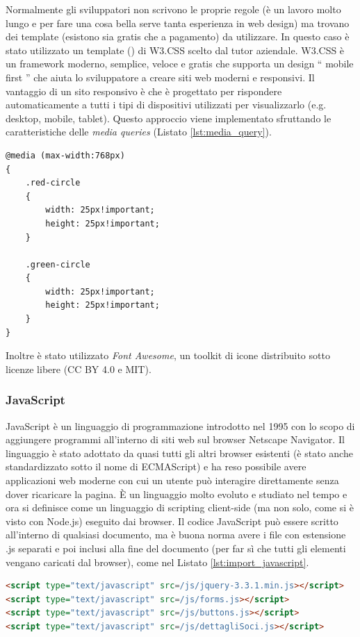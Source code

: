\documentclass[12pt]{report}
\begin{document}
Normalmente gli sviluppatori non scrivono le proprie regole (è un lavoro molto lungo e per fare una cosa bella serve tanta esperienza in web design) ma trovano dei template (esistono sia gratis che a pagamento) da utilizzare. In questo caso è stato utilizzato un template (\cite{w3css_template}) di W3.CSS scelto dal tutor aziendale. W3.CSS è un framework moderno, semplice, veloce e gratis che supporta un design \textquotedblleft{} mobile first \textquotedblright{} che aiuta lo sviluppatore a creare siti web moderni e responsivi. Il vantaggio di un sito responsivo è che è progettato per rispondere automaticamente a tutti i tipi di dispositivi utilizzati per visualizzarlo (e.g. desktop, mobile, tablet). Questo approccio viene implementato sfruttando le caratteristiche delle \emph{media queries} (Listato \ref{lst:media_query}).
\begin{lstlisting}[morekeywords={ @media, max-width, px, width, height, !important}, caption={Esempio di \emph{media query}}, label={lst:media_query}]
@media (max-width:768px)
{
	.red-circle
	{
		width: 25px!important;
		height: 25px!important;
	}
	
	.green-circle
	{
		width: 25px!important;
		height: 25px!important;
	}
}
\end{lstlisting}
Inoltre è stato utilizzato \emph{Font Awesome}, un toolkit di icone distribuito sotto licenze libere (CC BY 4.0 e MIT).
%
\subsubsection*{JavaScript}
%
JavaScript è un linguaggio di programmazione introdotto nel 1995 con lo scopo di aggiungere programmi all'interno di siti web sul browser Netscape Navigator. Il linguaggio è stato adottato da quasi tutti gli altri browser esistenti (è stato anche standardizzato sotto il nome di ECMAScript) e ha reso possibile avere applicazioni web moderne con cui un utente può interagire direttamente senza dover ricaricare la pagina\cite{eloquent_javascript}. È un linguaggio molto evoluto e studiato nel tempo e ora si definisce come un linguaggio di scripting client-side (ma non solo, come si è visto con Node.js) eseguito dai browser. Il codice JavaScript può essere scritto all'interno di qualsiasi documento, ma è buona norma avere i file con estensione .js separati e poi inclusi alla fine del documento (per far sì che tutti gli elementi vengano caricati dal browser), come nel Listato \ref{lst:import_javascript}.
\begin{lstlisting}[language=HTML, caption={Importazione dei file .js nel documento HTML}, label={lst:import_javascript}]
<script type="text/javascript" src=/js/jquery-3.3.1.min.js></script>
<script type="text/javascript" src=/js/forms.js></script>
<script type="text/javascript" src=/js/buttons.js></script>
<script type="text/javascript" src=/js/dettagliSoci.js></script>
\end{lstlisting}
\end{document}

